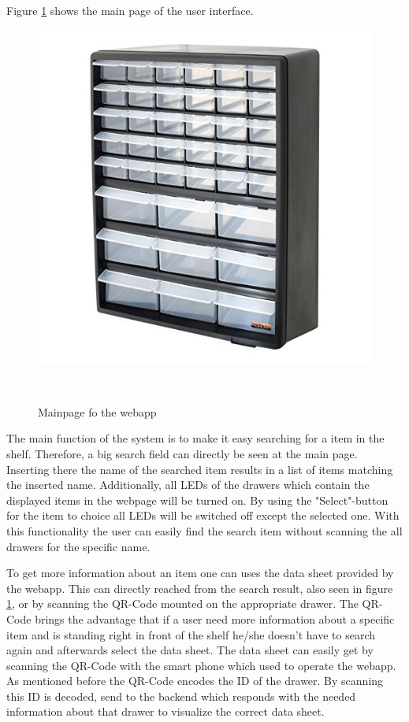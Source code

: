 Figure \ref{fig:webapp-mainpage} shows the main page of the user interface. 
%
\begin{figure}
	\includegraphics[width=0.9\columnwidth]{figures/example-prototype-shelf}
	\caption{Mainpage fo the webapp}~\label{fig:webapp-mainpage}
\end{figure}
%
The main function of the system is to make it easy searching for a item in the shelf. 
Therefore, a big search field can directly be seen at the main page. 
Inserting there the name of the searched item results in a list of items matching the inserted name. 
Additionally, all LEDs of the drawers which contain the displayed items in the webpage will be turned on. 
By using the "Select"-button for the item to choice all LEDs will be switched off except the selected one. 
With this functionality the user can easily find the search item without scanning the all drawers for the specific name. 

To get more information about an item one can uses the data sheet provided by the webapp. 
This can directly reached from the search result, also seen in figure \ref{fig:webapp-mainpage}, or by scanning the QR-Code mounted on the appropriate drawer. 
The QR-Code brings the advantage that if a user need more information about a specific item and is standing right in front of the shelf he/she doesn't have to search again and afterwards select the data sheet. 
The data sheet can easily get by scanning the QR-Code with the smart phone which used to operate the webapp. 
As mentioned before the QR-Code encodes the ID of the drawer. 
By scanning this ID is decoded, send to the backend which responds with the needed information about that drawer to visualize the correct data sheet. 